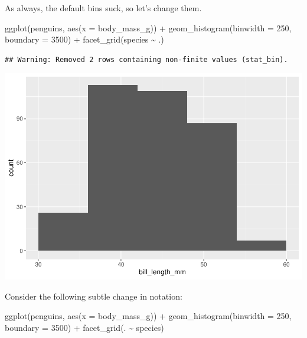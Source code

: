 \documentclass[
]{book}
\newenvironment{Shaded}{\begin{snugshade}}{\end{snugshade}}
\newcommand{\AttributeTok}[1]{\textcolor[rgb]{0.77,0.63,0.00}{#1}}
\newcommand{\DecValTok}[1]{\textcolor[rgb]{0.00,0.00,0.81}{#1}}
\newcommand{\FunctionTok}[1]{\textcolor[rgb]{0.00,0.00,0.00}{#1}}
\newcommand{\NormalTok}[1]{#1}
\newcommand{\SpecialCharTok}[1]{\textcolor[rgb]{0.00,0.00,0.00}{#1}}
\begin{document}
As always, the default bins suck, so let's change them.

\begin{Shaded}
\begin{Highlighting}[]
\FunctionTok{ggplot}\NormalTok{(penguins, }\FunctionTok{aes}\NormalTok{(}\AttributeTok{x =}\NormalTok{ body\_mass\_g)) }\SpecialCharTok{+}
    \FunctionTok{geom\_histogram}\NormalTok{(}\AttributeTok{binwidth =} \DecValTok{250}\NormalTok{, }\AttributeTok{boundary =} \DecValTok{3500}\NormalTok{) }\SpecialCharTok{+}
    \FunctionTok{facet\_grid}\NormalTok{(species }\SpecialCharTok{\textasciitilde{}}\NormalTok{ .)}
\end{Highlighting}
\end{Shaded}

\begin{verbatim}
## Warning: Removed 2 rows containing non-finite values (stat_bin).
\end{verbatim}

\includegraphics{intro_stats_files/figure-latex/unnamed-chunk-109-1.pdf}

Consider the following subtle change in notation:

\begin{Shaded}
\begin{Highlighting}[]
\FunctionTok{ggplot}\NormalTok{(penguins, }\FunctionTok{aes}\NormalTok{(}\AttributeTok{x =}\NormalTok{ body\_mass\_g)) }\SpecialCharTok{+}
    \FunctionTok{geom\_histogram}\NormalTok{(}\AttributeTok{binwidth =} \DecValTok{250}\NormalTok{, }\AttributeTok{boundary =} \DecValTok{3500}\NormalTok{) }\SpecialCharTok{+}
    \FunctionTok{facet\_grid}\NormalTok{(. }\SpecialCharTok{\textasciitilde{}}\NormalTok{ species)}
\end{Highlighting}
\end{Shaded}
\end{document}

